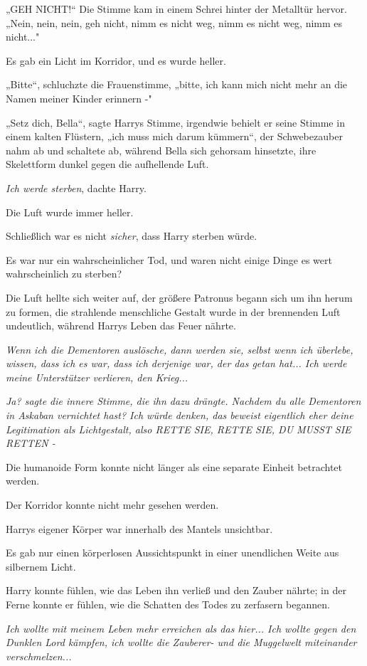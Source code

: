 {„GEH NICHT!“ Die Stimme kam in einem Schrei hinter der Metalltür hervor. „Nein, nein, nein, geh nicht, nimm es nicht weg, nimm es nicht weg, nimm es nicht..."

Es gab ein Licht im Korridor, und es wurde heller.

„Bitte“, schluchzte die Frauenstimme, „bitte, ich kann mich nicht mehr an die Namen meiner Kinder erinnern -"

„Setz dich, Bella“, sagte Harrys Stimme, irgendwie behielt er seine Stimme in einem kalten Flüstern, „ich muss mich darum kümmern“, der Schwebezauber nahm ab und schaltete ab, während Bella sich gehorsam hinsetzte, ihre Skelettform dunkel gegen die aufhellende Luft.

\emph{Ich werde sterben}, dachte Harry.

Die Luft wurde immer heller.

Schließlich war es nicht \emph{sicher}, dass Harry sterben würde.

Es war nur ein wahrscheinlicher Tod, und waren nicht einige Dinge es wert wahrscheinlich zu sterben?

Die Luft hellte sich weiter auf, der größere Patronus begann sich um ihn herum zu formen, die strahlende menschliche Gestalt wurde in der brennenden Luft undeutlich, während Harrys Leben das Feuer nährte.

\emph{\emph{Wenn ich die Dementoren auslösche, dann werden sie, selbst wenn ich überlebe, wissen, dass ich es war, dass ich derjenige war, der das getan hat... Ich werde meine Unterstützer verlieren, den Krieg...}}

\emph{\emph{Ja?} sagte die innere Stimme, die ihn dazu drängte. \emph{Nachdem du alle Dementoren in Askaban vernichtet hast? Ich würde denken, das beweist eigentlich eher deine Legitimation als Lichtgestalt, also RETTE SIE, RETTE SIE, DU MUSST SIE RETTEN -}}

Die humanoide Form konnte nicht länger als eine separate Einheit betrachtet werden.

Der Korridor konnte nicht mehr gesehen werden.

Harrys eigener Körper war innerhalb des Mantels unsichtbar.

Es gab nur einen körperlosen Aussichtspunkt in einer unendlichen Weite aus silbernem Licht.

Harry konnte fühlen, wie das Leben ihn verließ und den Zauber nährte; in der Ferne konnte er fühlen, wie die Schatten des Todes zu zerfasern begannen.

\emph{\emph{Ich wollte mit meinem Leben mehr erreichen als das hier... Ich wollte gegen den Dunklen Lord kämpfen, ich wollte die Zauberer- und die Muggelwelt miteinander verschmelzen...}}

}
